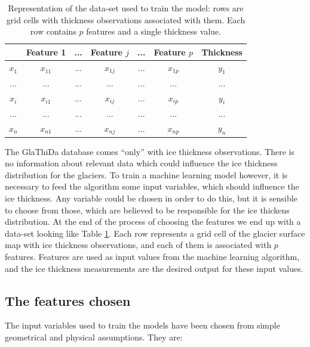 \begin{table}[!bp]
	\centering
	\caption{Representation of the data-set used to train the model: rows are grid cells with thickness observations associated with them. Each row contains $p$ features and a single thickness value.}
	\label{tab:features}
	\begin{tabular}{|c|c|c|c|c|c|c|} 
		\cline{2-7}
		\multicolumn{1}{l|}{} & Feature 1 & ... & Feature $j$ & ... & Feature $p$ & Thickness \\  
		\hline
		$x_1$              & $x_{11}$ & ... & $x_{1j}$     & ... & $x_{1p}$     & $y_1$ \\   
		\hline
		...                   & ...       & ... & ...           & ... & ...           & ...    \\     
		\hline
		$x_i$              & $x_{i1}$ & ... & $x_{ij}$     & ... & $x_{ip}$     & $y_i$    \\
		\hline
		...                   & ...       & ... & ...           & ... & ...           & ...  \\       
		\hline
		$x_n$              & $x_{n1}$ & ... & $x_{nj}$     & ... & $x_{np}$     & $y_n$   \\      
		\hline
	\end{tabular}
\end{table}


The GlaThiDa database comes ``only'' with ice thickness observations. There is no information about relevant data which could influence the ice thickness distribution for the glaciers. To train a machine learning model however, it is necessary to feed the algorithm some input variables, which should influence the ice thickness. Any variable could be chosen in order to do this, but it is sensible to choose from those, which are believed to be responsible for the ice thickens distribution. At the end of the process of choosing the features we end up with a data-set looking like Table \ref{tab:features}. Each row represents a grid cell of the glacier surface map with ice thickness observations, and each of them is associated with $p$ features. Features are used as input values from the machine learning algorithm, and the ice thickness measurements are the desired output for these input values. 


\subsection{The features chosen}\label{features-chosen}
The input variables used to train the models have been chosen from simple geometrical and physical assumptions. They are:

